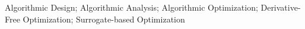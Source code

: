 \noindent Algorithmic Design; Algorithmic Analysis; Algorithmic Optimization; Derivative-Free Optimization; Surrogate-based Optimization